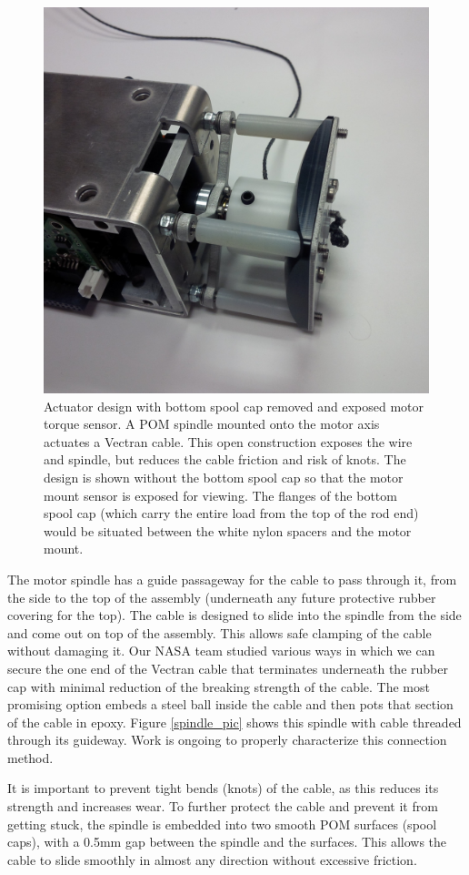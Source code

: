 \documentclass[12pt]{report}
\begin{document}
\begin{figure}
   \centering
   \includegraphics[width=0.45\columnwidth]{img/actuation.jpg} 
   \caption{Actuator design with bottom spool cap removed and exposed motor torque sensor. 
A POM spindle mounted onto the motor axis actuates a Vectran cable. 
This open construction exposes the wire and spindle, but reduces the cable friction and risk of knots.
The design is shown without the bottom spool cap so that the motor mount sensor is exposed for viewing.
The flanges of the bottom spool cap (which carry the entire load from the top of the rod end) would be situated between the white nylon spacers and the motor mount.~\cite{sabelhaus2014hardware}}
   \label{actuation_open_view}
   \vspace{-0.2cm}
\end{figure}



The motor spindle has a guide passageway for the cable to pass through it, 
from the side to the top of the assembly (underneath any future protective rubber covering for the top).
The cable is designed to slide into the spindle from the side and come out on top of the assembly.
This allows safe clamping of the cable without damaging it.
Our NASA team studied various ways in which we can secure the one end of the Vectran cable that terminates underneath the rubber cap with minimal reduction of the breaking strength of the cable.
The most promising option embeds a steel ball inside the cable and then pots that section of the cable in epoxy.
Figure \ref{spindle_pic} shows this spindle with cable threaded through its guideway.
Work is ongoing to properly characterize this connection method.


It is important to prevent tight bends (knots) of the cable, as this reduces its strength and increases wear.
To further protect the cable and prevent it from getting stuck, the spindle is embedded into two smooth POM surfaces (spool caps), 
with a 0.5mm gap between the spindle and the surfaces.
This allows the cable to slide smoothly in almost any direction without excessive friction.
\end{document}
